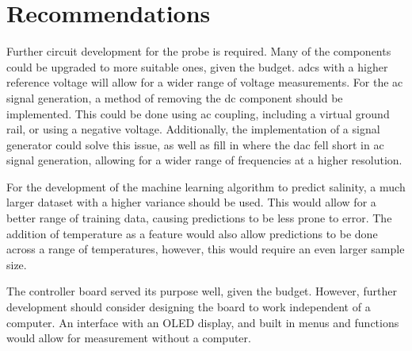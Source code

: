 \chapter{Recommendations}

Further circuit development for the probe is required.
Many of the components could be upgraded to more suitable ones, given the budget.
\gls{adc}s with a higher reference voltage will allow for a wider range of voltage measurements.
For the \gls{ac} signal generation, a method of removing the \gls{dc} component should be implemented.
This could be done using \gls{ac} coupling, including a virtual ground rail, or using a negative voltage.
Additionally, the implementation of a signal generator could solve this issue, as well as fill in where the \gls{dac} fell short in \gls{ac} signal generation, allowing for a wider range of frequencies at a higher resolution.

For the development of the machine learning algorithm to predict salinity, a much larger dataset with a higher variance should be used.
This would allow for a better range of training data, causing predictions to be less prone to error. The addition of temperature as a feature would also allow predictions to be done across a range of temperatures, however, this would require an even larger sample size.

The controller board served its purpose well, given the budget. However, further development should consider designing the board to work independent of a computer.
An interface with an OLED display, and built in menus and functions would allow for measurement without a computer.

